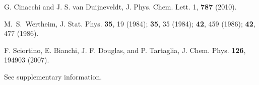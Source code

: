 \documentclass[10pt,onside,singlecolumn]{article}
\begin{document}
{\begin{thebibliography}{99}
G. Cinacchi and J. S. van Duijneveldt, J. Phys. Chem.
Lett. 1, {\bf 787} (2010).

M.~S.~Wertheim, J. Stat. Phys. {\bf 35}, 19 (1984); {\bf 35}, 35 (1984); {\bf 42}, 459 (1986);  {\bf 42}, 477 (1986).

F. Sciortino, E. Bianchi, J. F. Douglas,
and P. Tartaglia, J. Chem. Phys. {\bf 126}, 194903 (2007).


See supplementary information.

\end{thebibliography}

}
\end{document}
